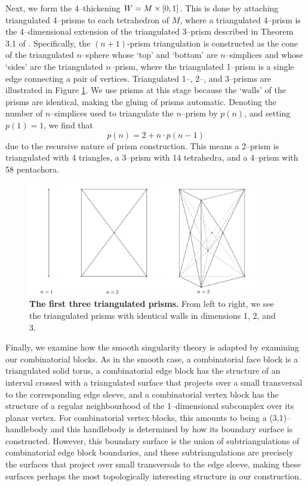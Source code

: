 Next, we form the 4--thickening $W=M\times[0,1]$.
This is done by attaching triangulated 4--prisms to each tetrahedron of $M$, where a triangulated 4--prism is the 4--dimensional extension of the triangulated 3--prism described in Theorem 3.1 of \cite{burton2011simplification}.
Specifically, the $(n+1)$-prism triangulation is constructed as the cone of the triangulated $n$--sphere whose `top' and `bottom' are $n$--simplices and whose `sides' are the triangulated $n$--prism, where the triangulated 1--prism is a single edge connecting a pair of vertices.
Triangulated 1--, 2--, and 3--prisms are illustrated in Figure \ref{fig:prisms}.
We use prisms at this stage because the `walls' of the prisms are identical, making the gluing of prisms automatic.
Denoting the number of $n$--simplices used to triangulate the $n$--prism by $p(n)$, and setting $p(1)=1$, we find that
\[
	p(n) = 2 + n\cdot p(n-1)
\]
due to the recursive nature of prism construction.
This means a 2--prism is triangulated with 4 triangles, a 3--prism with 14 tetrahedra, and a 4--prism with 58 pentachora.

\begin{figure}[h!]
	\centering
	\includegraphics[width=0.9\textwidth]{figures/prisms.png}
	\caption{
		\textbf{The first three triangulated prisms.}
		From left to right, we see the triangulated prisms with identical walls in dimensions 1, 2, and 3.
	}
	\label{fig:prisms}
\end{figure}

Finally, we examine how the smooth singularity theory is adapted by examining our combinatorial blocks.
As in the smooth case, a combinatorial face block is a triangulated solid torus, a combinatorial edge block has the structure of an interval crossed with a triangulated surface that projects over a small transversal to the corresponding edge sleeve, and a combinatorial vertex block has the structure of a regular neighbourhood of the 1--dimensional subcomplex over its planar vertex.
For combinatorial vertex blocks, this amounts to being a (3,1)--handlebody and this handlebody is determined by how its boundary surface is constructed.
However, this boundary surface is the union of subtriangulations of combinatorial edge block boundaries, and these subtriangulations are precisely the surfaces that project over small transversals to the edge sleeve, making these surfaces perhaps the most topologically interesting structure in our construction.



